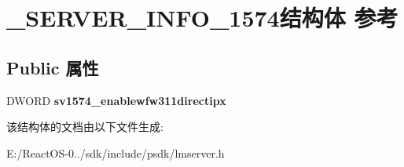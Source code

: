 \hypertarget{struct___s_e_r_v_e_r___i_n_f_o__1574}{}\section{\+\_\+\+S\+E\+R\+V\+E\+R\+\_\+\+I\+N\+F\+O\+\_\+1574结构体 参考}
\label{struct___s_e_r_v_e_r___i_n_f_o__1574}
\subsection*{Public 属性}
\begin{DoxyCompactItemize}
\item 
\mbox{\label{struct___s_e_r_v_e_r___i_n_f_o__1574_ab35e2ba7e1648daf587061e9c2a2e9ee}} 
D\+W\+O\+RD {\bfseries sv1574\+\_\+enablewfw311directipx}
\end{DoxyCompactItemize}


该结构体的文档由以下文件生成\+:\begin{DoxyCompactItemize}
\item 
E\+:/\+React\+O\+S-\/0../sdk/include/psdk/lmserver.\+h\end{DoxyCompactItemize}
